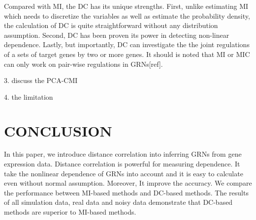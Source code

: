\documentclass{bioinfo}
\begin{document}
Compared with MI, the DC has its unique strengths. First, unlike estimating MI which needs to discretize the variables as well as estimate the probability density, the calculation of DC is quite straightforward without any distribution assumption. Second, DC has been proven its power in detecting non-linear dependence. Lastly, but importantly, DC can investigate the the joint regulations of a sets of target genes by two or more genes. It should is noted that MI or MIC can only work on pair-wise regulations in GRNs[ref].

3. discuss the PCA-CMI

4. the limitation


\section{CONCLUSION}
In this paper, we introduce distance correlation into inferring GRNs
from gene expression data. Distance correlation is powerful for
measuring dependence. It take the nonlinear dependence of GRNs into
account and it is easy to calculate even without normal assumption.
Moreover, It improve the accuracy. We compare the performance
between MI-based methods and DC-based methods. The results of all
simulation data, real data and noisy data demonstrate that DC-based
methods are superior to MI-based methods.


%
%
%
%
%
%


\end{document}
